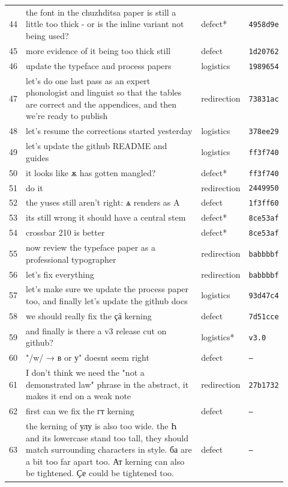 \begin{longtable}{@{}p{0.04\linewidth}p{0.66\linewidth}p{0.13\linewidth}p{0.09\linewidth}@{}}
44 & the font in the chuzhditsa paper is still a little too thick - or is the inline variant not being used? & defect* & \texttt{4958d9e} \\
45 & more evidence of it being too thick still & defect & \texttt{1d20762} \\
46 & update the typeface and process papers & logistics & \texttt{1989654} \\
47 & let's do one last pass as an expert phonologist and linguist so that the tables are correct and the appendices, and then we're ready to publish & redirection & \texttt{73831ac} \\
48 & let's resume the corrections started yesterday & logistics & \texttt{378ee29} \\
49 & let's update the github README and guides & logistics & \texttt{ff3f740} \\
50 & it looks like ѫ has gotten mangled? & defect* & \texttt{ff3f740} \\
51 & do it & redirection & \texttt{2449950} \\
52 & the yuses still aren't right: ѧ renders as A & defect & \texttt{1f3ff60} \\
53 & its still wrong it should have a central stem & defect* & \texttt{8ce53af} \\
54 & crossbar 210 is better & defect* & \texttt{8ce53af} \\
55 & now review the typeface paper as a professional typographer & redirection & \texttt{babbbbf} \\
56 & let's fix everything & redirection & \texttt{babbbbf} \\
57 & let's make sure we update the process paper too, and finally let's update the github docs & logistics & \texttt{93d47c4} \\
58 & we should really fix the ҫӓ kerning & defect & \texttt{7d51cce} \\
59 & and finally is there a v3 release cut on github? & logistics* & \texttt{v3.0} \\
60 & "/w/ → в or у" doesnt seem right & defect & \texttt{—} \\
61 & I don't think we need the "not a demonstrated law" phrase in the abstract, it makes it end on a weak note & redirection & \texttt{27b1732} \\
62 & first can we fix the гт kerning & defect & \texttt{—} \\
63 & the kerning of улу is also too wide. the Һ and its lowercase stand too tall, they should match surrounding characters in style. ба are a bit too far apart too. Ат kerning can also be tightened. Ҫе could be tightened too. & defect & \texttt{—} \\

\end{longtable}
